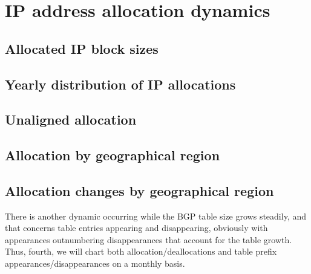 \section{IP address allocation dynamics}
\label{sec:allocations}


\subsection{Allocated IP block sizes}

\subsection{Yearly distribution of IP allocations}

\subsection{Unaligned allocation}

\subsection{Allocation by geographical region}




\subsection{Allocation changes by geographical region}

There is another dynamic occurring while the BGP table size grows steadily, and that concerns table entries appearing and disappearing, obviously with appearances outnumbering disappearances that account for the table growth.  Thus, fourth, we will chart both allocation/deallocations and table prefix appearances/disappearances on a monthly basis.

